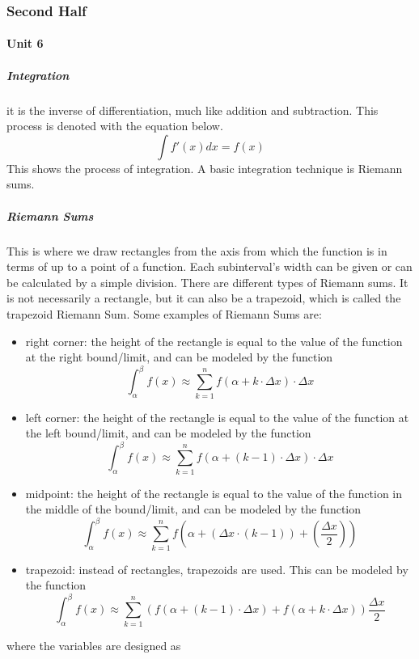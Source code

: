 \documentclass{article} %
\begin{document}
        \subsubsection{Second Half}
            \paragraph{Unit 6}
                \subparagraph{Integration}
                    it is the inverse of differentiation, much like addition and subtraction. This process is denoted with the equation below.
                    $$\int f'(x)dx = f(x)$$
                    This shows the process of integration. A basic integration technique is Riemann sums.
                \subparagraph{Riemann Sums}
                    This is where we draw rectangles from the axis from which the function is in terms of up to a point of a function. Each subinterval's width can be given or can be calculated by a simple division. There are different types of Riemann sums.
                    It is not necessarily a rectangle, but it can also be a trapezoid, which is called the trapezoid Riemann Sum.
                    Some examples of Riemann Sums are:
                    \begin{itemize}
                        \item right corner: the height of the rectangle is equal to the value of the function at the right bound/limit, and can be modeled by the function $$\int_\alpha^\beta f(x)\approx \sum_{k=1}^{n}f(\alpha+k \cdot \Delta x)\cdot\Delta x$$
                        \item left corner: the height of the rectangle is equal to the value of the function at the left bound/limit, and can be modeled by the function $$\int_\alpha^\beta f(x) \approx \sum_{k=1}^{n}f(\alpha+(k-1)\cdot \Delta x)\cdot\Delta x$$
                        \item midpoint: the height of the rectangle is equal to the value of the function in the middle of the bound/limit, and can be modeled by the function $$\int_\alpha^\beta f(x)\approx \sum_{k=1}^{n}f(\alpha+(\Delta x\cdot(k-1))+(\frac{\Delta x}{2}))$$
                    \item trapezoid: instead of rectangles, trapezoids are used. This can be modeled by the function $$\int_\alpha^\beta f(x)\approx \sum_{k=1}^{n}(f(\alpha+(k-1)\cdot\Delta x)+f(\alpha+k\cdot\Delta x))\frac{\Delta x}{2}$$
                    \end{itemize}
                    where the variables are designed as
\end{document}
